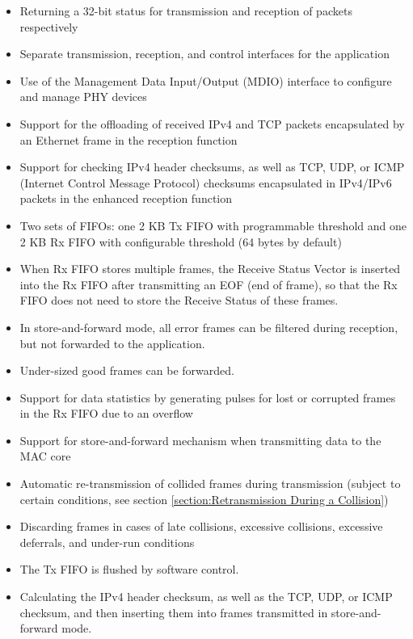 \documentclass[main\_\_EN.tex]{subfiles}
\begin{document}
\begin{itemize}
\begin{itemize}
    	\item{Up to eight 48-bit SA address comparison checks to mask each byte}
        \item{All multicast address frames can be transmitted}
        \item{All frames in mixed mode can be transmitted without being filtered for network monitoring}
        \item{A status report is attached each time all incoming packets are transmitted and filtered}
    \end{itemize}
	\item Returning a 32-bit status for transmission and reception of packets respectively
	\item Separate transmission, reception, and control interfaces for the application
	\item Use of the Management Data Input/Output (MDIO) interface to configure and manage PHY devices
	\item Support for the offloading of received IPv4 and TCP packets encapsulated by an Ethernet frame in the reception function
	\item Support for checking IPv4 header checksums, as well as TCP, UDP, or ICMP (Internet Control Message Protocol) checksums encapsulated in IPv4/IPv6 packets in the enhanced reception function
	\item Two sets of FIFOs: one 2 KB Tx FIFO with programmable threshold and one 2 KB Rx FIFO with configurable threshold (64 bytes by default)
	\item When Rx FIFO stores multiple frames, the Receive Status Vector is inserted into the Rx FIFO after transmitting an EOF (end of frame), so that the Rx FIFO does not need to store the Receive Status of these frames.
	\item In store-and-forward mode, all error frames can be filtered during reception, but not forwarded to the application.
	\item Under-sized good frames can be forwarded.
	\item Support for data statistics by generating pulses for lost or corrupted frames in the Rx FIFO due to an overflow
	\item Support for store-and-forward mechanism when transmitting data to the MAC core
	\item Automatic re-transmission of collided frames during transmission (subject to certain conditions, see section \ref{section:Retransmission During a Collision})
	\item Discarding frames in cases of late collisions, excessive collisions, excessive deferrals, and under-run conditions
	\item The Tx FIFO is flushed by software control.
	\item Calculating the IPv4 header checksum, as well as the TCP, UDP, or ICMP checksum, and then inserting them into frames transmitted in store-and-forward mode.
\end{itemize}
\end{document}
